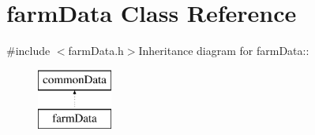 \hypertarget{classfarm_data}{
\section{farmData Class Reference}
\label{classfarm_data}
}


{\ttfamily \#include $<$farmData.h$>$}Inheritance diagram for farmData::\begin{figure}[H]
\begin{center}
\leavevmode
\includegraphics[height=2cm]{classfarm_data}
\end{center}
\end{figure}
